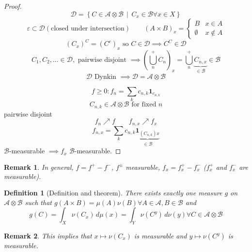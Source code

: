 \documentclass[a4paper]{article}
\newcounter{lecref}[section]
\numberwithin{lecref}{section}
\theoremstyle{break}
\newtheorem{definition}[lecref]{Definition}
\newtheorem*{Remark}{Remark}
\newcommand{\SetDef}[2]{\left\{#1\,\mid\,#2\right\}}
\begin{document}
\begin{proof}
  \[ \mathcal D = \SetDef{C \in \mathcal A \otimes \mathcal B}{C_x \in \mathcal B \forall x \in X} \]
  \[ \varepsilon \subset \mathcal D (\text{closed under intersection}) \qquad (A \times B)_{x} = \begin{cases} B & x \in A \\ \emptyset & x \not\in A \end{cases} \]
  \[ (C_x)^C = (C^c)_x \text{ so } C \in \mathcal D \implies C^C \in \mathcal D \]
  \[ C_1, C_2, \dots \in \mathcal D, \text{ pairwise disjoint } \implies \left(\bigcup_{n}^+ C_n\right)_x = \bigcup_{n}^+ \underbrace{C_{n,x}}_{\in \mathcal B} \in \mathcal B \]
  \[ \mathcal D \text{ Dynkin } \implies \mathcal D = \mathcal A \otimes \mathcal B \]

  \[ f \geq 0: f_n = \sum_k c_{n,k} \mathbf{1}_{c_{n,k}} \]
  \[ C_{n,k} \in \mathcal A \otimes \mathcal B \text{ for fixed } n \]
  pairwise disjoint
  \[ f_n \nearrow f \qquad f_{n,x} \nearrow f_x \]
  \[ f_{n,x} = \sum_k c_{n,k} \underbrace{\mathbf{1}_{(C_{n,k})x}}_{\in \mathcal B} \]
  $\mathcal B$-measurable $\implies f_x$ $\mathcal B$-measurable.
\end{proof}

\begin{Remark}
  In general, $f = f^+ - f^-$, $f^{\pm}$ measurable, $f_x = f_x^+ - f_x^-$ ($f_x^+$ and $f_x^-$ are measurable).
\end{Remark}

\begin{definition}[Definition and theorem]
  There exists exactly one measure $g$ on $\mathcal A \otimes \mathcal B$ such that $g(A \times B) = \mu(A) \nu(B) \forall A \in \mathcal A, B \in \mathcal B$ and
  \[ g(C) = \int_X \nu(C_x) \, d\mu(x) = \int_Y \nu(C^y) \, d\nu(y) \forall C \in \mathcal A \otimes \mathcal B \]
\end{definition}

\begin{Remark}
  This implies that $x \mapsto \nu(C_x)$ is measurable and $y \mapsto \nu(C^y)$ is measurable.
\end{Remark}
\end{document}
